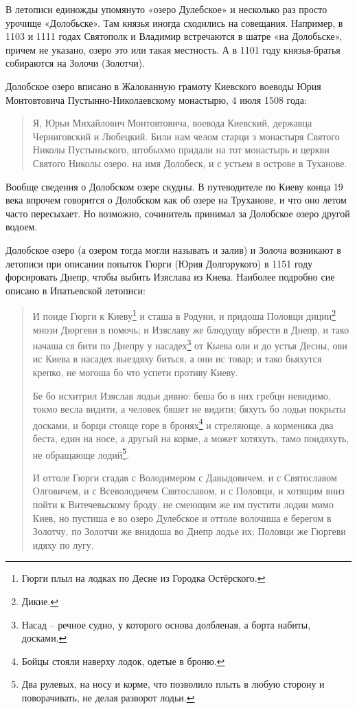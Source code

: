 В летописи единожды упомянуто «озеро Дулебское» и несколько раз просто урочище «Долобьске». Там князья иногда сходились на совещания. Например, в 1103 и 1111 годах Святополк и Владимир встречаются в шатре «на Долобьске», причем не указано, озеро это или такая местность. А в 1101 году князья-братья собираются на Золочи (Золотчи).

Долобское озеро вписано в Жалованную грамоту Киевского воеводы Юрия Монтовтовича Пустынно-Никола\-евскому монастырю, 4 июля 1508 года:

\begin{quotation}
Я, Юрьи Михайлович Монтовтовича, воевода Киевский, державца Черниговский и Любецкий. Били нам челом старци з монастыря Святого Николы Пустыньского, штобыхмо придали на тот монастырь и церкви Святого Николы озеро, на имя Долобеск, и с устьем в острове в Туханове.
\end{quotation}

Вообще сведения о Долобском озере скудны. В путеводителе по Киеву конца 19 века впрочем говорится о Долобском как об озере на Труханове, и что оно летом часто пересыхает. Но возможно, сочинитель принимал за Долобское озеро другой водоем.

Долобское озеро (а озером тогда могли называть и залив) и Золоча возникают в летописи при описании попыток Гюрги (Юрия Долгорукого) в 1151 году форсировать Днепр, чтобы выбить Изяслава из Киева. Наиболее подробно сие описано в Ипатьевской летописи:

\begin{quotation}
И поиде Гюрги к Киеву\footnote{Гюрги плыл на лодках по Десне из Городка Остёрского.} и сташа в Родуни, и придоша Половци диции\footnote{Дикие.} мнози Дюргеви в помочь; и Изяславу же блюдущу вбрести в Днепр, и тако начаша ся бити по Днепру у насадех\footnote{Насад – речное судно, у которого основа долбленая, а борта набиты, досками.} от Кыева оли и до устья Десны, ови ис Киева в насадех выездяху биться, а они ис товар; и тако бьяхутся крепко, не могоша бо что успети противу Киеву. 

Бе бо исхитрил Изяслав лодьи дивно: беша бо в них гребци невидимо, токмо весла видити, а человек бяшет не видити; бяхуть бо лодьи покрыты досками, и борци стояще горе в бронях\footnote{Бойцы стояли наверху лодок, одетые в броню.} и стреляюще, а корменика два беста, един на носе, а другый на корме, а может хотяхуть, тамо поидяхуть, не обращающе лодий\footnote{Два рулевых, на носу и корме, что позволило плыть в любую сторону и поворачивать, не делая разворот лодьи.}.

И оттоле Гюрги сгадав с Володимером с Давыдовичем, и с Святославом Олговичем, и с Всеволодичем Святославом, и с Половци, и хотящим вниз пойти к Витечевьскому броду, не смеющим же им пустити лодии мимо Киев, но пустиша е во озеро Дулебское и оттоле волочиша е берегом в Золотчу, по Золотчи же внидоша во Днепр лодье их; Половци же Гюргеви идяху по лугу.
\end{quotation}

